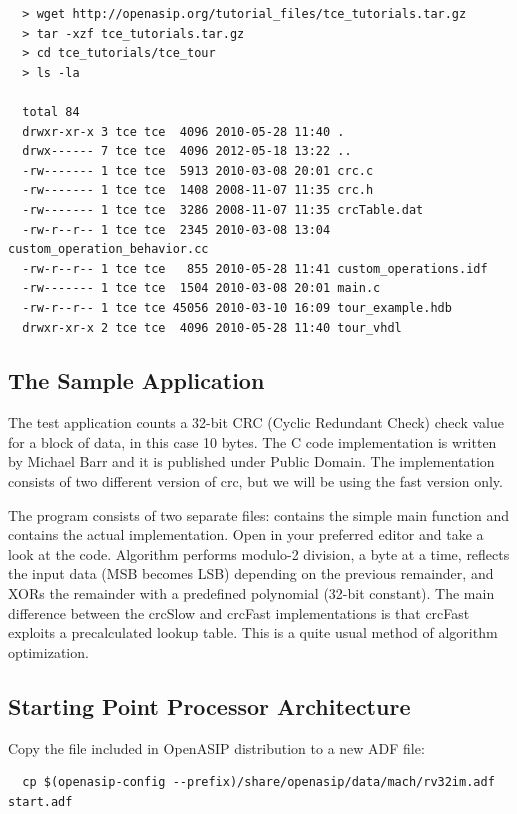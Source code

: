 \documentclass[a4paper,twoside]{tceusermanual}
\begin{document}
\begin{verbatim}
  > wget http://openasip.org/tutorial_files/tce_tutorials.tar.gz
  > tar -xzf tce_tutorials.tar.gz
  > cd tce_tutorials/tce_tour
  > ls -la
  
  total 84
  drwxr-xr-x 3 tce tce  4096 2010-05-28 11:40 .
  drwx------ 7 tce tce  4096 2012-05-18 13:22 ..
  -rw------- 1 tce tce  5913 2010-03-08 20:01 crc.c
  -rw------- 1 tce tce  1408 2008-11-07 11:35 crc.h
  -rw------- 1 tce tce  3286 2008-11-07 11:35 crcTable.dat
  -rw-r--r-- 1 tce tce  2345 2010-03-08 13:04 custom_operation_behavior.cc
  -rw-r--r-- 1 tce tce   855 2010-05-28 11:41 custom_operations.idf
  -rw------- 1 tce tce  1504 2010-03-08 20:01 main.c
  -rw-r--r-- 1 tce tce 45056 2010-03-10 16:09 tour_example.hdb
  drwxr-xr-x 2 tce tce  4096 2010-05-28 11:40 tour_vhdl
\end{verbatim}

\subsection{The Sample Application}

The test application counts a 32-bit CRC (Cyclic Redundant Check)
check value for a block of data, in this case 10 bytes. The C code
implementation is written by Michael Barr and it is published under
Public Domain. The implementation consists of two different version of
crc, but we will be using the fast version only.

The program consists of two separate files:  contains the
simple main function and  contains the actual
implementation. Open  in your preferred editor and take a
look at the code. Algorithm performs modulo-2 division, a byte at a
time, reflects the input data (MSB becomes LSB) depending on the
previous remainder, and XORs the remainder with a predefined
polynomial (32-bit constant). The main difference between the crcSlow
and crcFast implementations is that crcFast exploits a precalculated
lookup table. This is a quite usual method of algorithm optimization.

\subsection{Starting Point Processor Architecture}


Copy the  file included in OpenASIP distribution to a new ADF
file:

\begin{verbatim}
  cp $(openasip-config --prefix)/share/openasip/data/mach/rv32im.adf start.adf
\end{verbatim}
\end{document}
